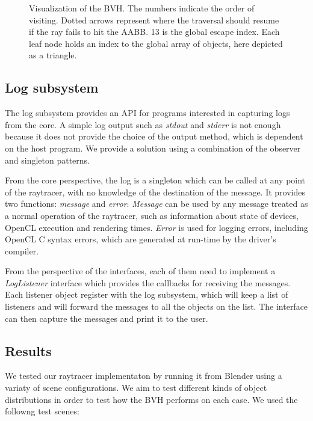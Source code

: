 \documentclass{vgtc}
\begin{document}
\begin{figure}
\centering


\caption{Visualization of the BVH. The numbers indicate the order of
  visiting. Dotted arrows represent where the traversal should resume
  if the ray fails to hit the AABB. 13 is the global escape
  index. Each leaf node holds an index to the global array of objects,
  here depicted as a triangle.}
\label{fig:bvh}
\end{figure}


\subsection{Log subsystem}

The log subsystem provides an API for programs interested in capturing
logs from the core. A simple log output such as \emph{stdout} and
\emph{stderr} is not enough because it does not provide the choice of
the output method, which is dependent on the host program. We provide
a solution using a combination of the observer and singleton patterns.

From the core perspective, the log is a singleton which can be called
at any point of the raytracer, with no knowledge of the destination of
the message. It provides two functions: \emph{message} and
\emph{error}. \emph{Message} can be used by any message treated as a normal
operation of the raytracer, such as information about state of
devices, OpenCL execution and rendering times. \emph{Error} is used for
logging errors, including OpenCL C syntax errors, which are generated at
run-time by the driver's compiler.

From the perspective of the interfaces, each of them need to implement
a \emph{LogListener} interface which provides the callbacks for
receiving the messages. Each listener object register with the log
subsystem, which will keep a list of listeners and will forward the
messages to all the objects on the list. The interface can then
capture the messages and print it to the user.

\subsection{Results}
\label{sec:results}

We tested our raytracer implementaton by running it from Blender using
a variaty of scene configurations. We aim to test different kinds of
object distributions in order to test how the BVH performs on each
case. We used the followng test scenes:
\end{document}
